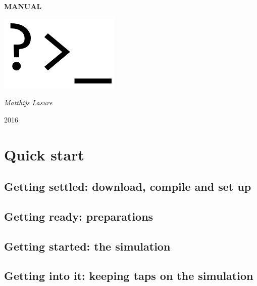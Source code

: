 \documentclass[a4paper,fleqn]{report}
\begin{document}
	
	\pagestyle{MyStyle}
	
	\begin{titlepage}
		\centering
		\null
		\vspace{5cm}

		{\huge\bfseries MANUAL\par}
		\vspace{1.5cm}
		\includegraphics[width=0.5\linewidth]{images/prompt.png}
		\vfill
		
		{\Large\itshape Matthijs Lasure\par}
		
		\vspace{1.5cm}
		
		{\large 2016\par}
		
	\end{titlepage}
	
	\tableofcontents
	
	\part{Quick start}
	
	\chapter{Getting settled: download, compile and set up}
	
	
	\chapter{Getting ready: preparations}
	
	
	\chapter{Getting started: the simulation}
	
	
	\chapter{Getting into it: keeping taps on the simulation}
	
	
\end{document}
